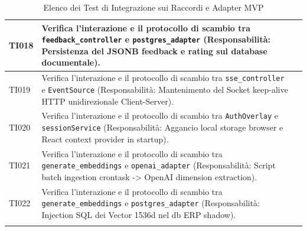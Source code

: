 \documentclass[a4paper,11pt,oneside]{scrartcl}
\begin{document}
\begin{longtable}{|p{1.9cm}|p{11.6cm}|c|}
TI018 & Verifica l'interazione e il protocollo di scambio tra \texttt{feedback\_controller} e \texttt{postgres\_adapter} (Responsabilità: Persistenza del JSONB feedback e rating sul database documentale). & \\ \hline
TI019 & Verifica l'interazione e il protocollo di scambio tra \texttt{sse\_controller} e \texttt{EventSource} (Responsabilità: Mantenimento del Socket keep-alive HTTP unidirezionale Client-Server). & \\ \hline
TI020 & Verifica l'interazione e il protocollo di scambio tra \texttt{AuthOverlay} e \texttt{sessionService} (Responsabilità: Aggancio local storage browser e React context provider in startup). & \\ \hline
TI021 & Verifica l'interazione e il protocollo di scambio tra \texttt{generate\_embeddings} e \texttt{openai\_adapter} (Responsabilità: Script batch ingestion crontask -> OpenAI dimension extraction). & \\ \hline
TI022 & Verifica l'interazione e il protocollo di scambio tra \texttt{generate\_embeddings} e \texttt{postgres\_adapter} (Responsabilità: Injection SQL dei Vector 1536d nel db ERP shadow). & \\ \hline
\caption{Elenco dei Test di Integrazione sui Raccordi e Adapter MVP}
\end{longtable}
\end{document}
